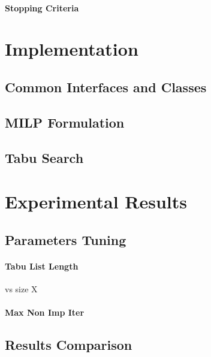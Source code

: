 \documentclass{article}
\begin{document}
\paragraph{Stopping Criteria}

\section{Implementation}

\subsection{Common Interfaces and Classes}
\subsection{MILP Formulation}
\subsection{Tabu Search}

\section{Experimental Results}

\subsection{Parameters Tuning}
\paragraph{Tabu List Length} vs size X
\paragraph{Max Non Imp Iter}

\subsection{Results Comparison}

\printbibliography
\end{document}

